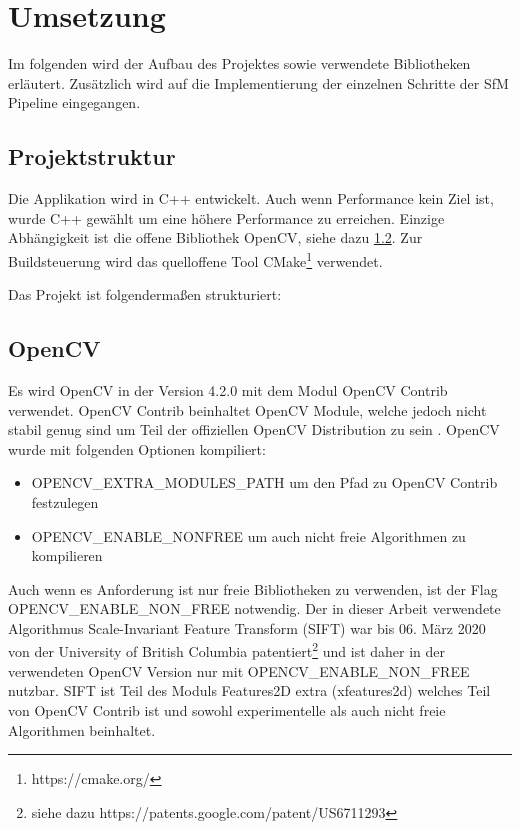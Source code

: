 
\chapter{Umsetzung}\label{sec:implementation}
Im folgenden wird der Aufbau des Projektes sowie verwendete Bibliotheken erläutert.
Zusätzlich wird auf die Implementierung der einzelnen Schritte der SfM Pipeline eingegangen.

\section{Projektstruktur}
Die Applikation wird in C++ entwickelt.
Auch wenn Performance kein Ziel ist, wurde C++ gewählt um eine höhere Performance zu erreichen.
Einzige Abhängigkeit ist die offene Bibliothek OpenCV, siehe dazu \ref{sec:opencv}.
Zur Buildsteuerung wird das quelloffene Tool CMake\footnote{https://cmake.org/} verwendet.

Das Projekt ist folgendermaßen strukturiert:



\section{OpenCV}\label{sec:opencv}
Es wird OpenCV in der Version 4.2.0 mit dem Modul OpenCV Contrib verwendet.
OpenCV Contrib beinhaltet OpenCV Module, welche jedoch nicht stabil genug sind um Teil der offiziellen OpenCV Distribution zu sein \cite[README.md]{opencv_2013}.
OpenCV wurde mit folgenden Optionen kompiliert:
\begin{itemize}
	\item OPENCV\_EXTRA\_MODULES\_PATH um den Pfad zu OpenCV Contrib festzulegen
	\item OPENCV\_ENABLE\_NONFREE um auch nicht freie Algorithmen zu kompilieren
\end{itemize}
Auch wenn es Anforderung ist nur freie Bibliotheken zu verwenden, ist der Flag OPENCV\_ENABLE\_NON\_FREE notwendig.
Der in dieser Arbeit verwendete Algorithmus Scale-Invariant Feature Transform (SIFT) war bis 06. März 2020 von der University of British Columbia patentiert\footnote{siehe dazu https://patents.google.com/patent/US6711293} und ist daher in der verwendeten OpenCV Version nur mit OPENCV\_ENABLE\_NON\_FREE nutzbar.
SIFT ist Teil des Moduls Features2D extra (xfeatures2d) welches Teil von OpenCV Contrib ist und sowohl experimentelle als auch nicht freie Algorithmen beinhaltet.

